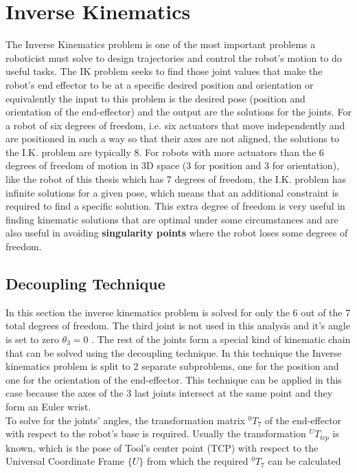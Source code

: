 \section{Inverse Kinematics}

The Inverse Kinematics problem is one of the most important problems a roboticist must solve to design trajectories and control the robot's motion to do useful tasks. The IK problem seeks to find 
those joint values that make the robot's end effector to be at a specific desired position and orientation or equivalently the input to this problem is the desired pose (position and orientation of the end-effector) 
and the output are the solutions for the joints. For a robot of six degrees of freedom, i.e. six actuators that move independently and are positioned in such a way so that their axes are not aligned, the solutions 
to the I.K. problem are typically 8. For robots with more actuators than the 6 degrees of freedom of motion in 3D space (3 for position and 3 for orientation), like the robot of this thesis which has 7 degrees of freedom, 
the I.K. problem has infinite solutions for a given pose, which means that an additional constraint is required to find a specific solution. This extra degree of freedom is very useful in finding kinematic solutions 
that are optimal under some circumstances and are also useful in avoiding \textbf{singularity points} where the robot loses some degrees of freedom.

\subsection{Decoupling Technique}

In this section the inverse kinematics problem is solved for only the 6 out of the 7 total degrees of freedom. The third joint is not used in this 
analysis and it's angle is set to zero $θ_3 = 0$ . The rest of the joints form a special kind of kinematic chain that can be solved using the 
decoupling technique. In this technique the Inverse kinematics problem is split to 2 separate subproblems, one for the position and one for the 
orientation of the end-effector. This technique can be applied in this case because the axes of the 3 last joints intersect at the same point and 
they form an Euler wrist. \\

To solve for the joints' angles, the transformation matrix $^0T_7$ of the end-effector with respect to the robot's base is required. Usually the transformation ${}^UT_{tcp}$ is known, which is the pose of Tool's center point (TCP) with respect to the Universal Coordinate Frame $\lbrace U \rbrace$ from which the required $^0T_7$ can be calculated

